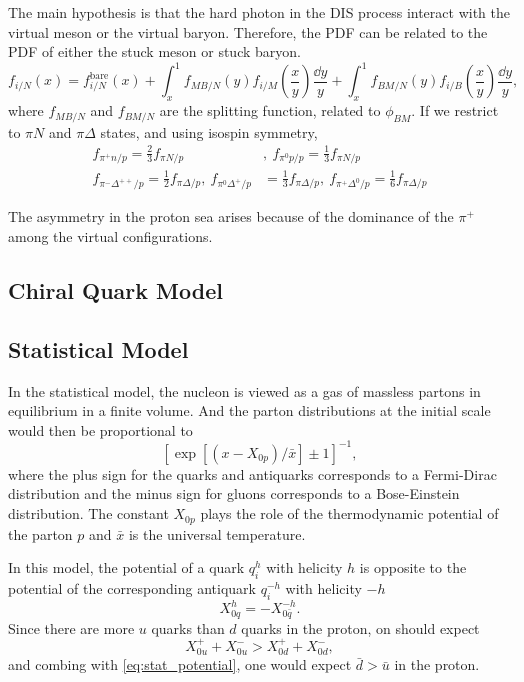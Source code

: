 \documentclass[../main.tex]{subfiles}
\begin{document}
The main hypothesis is that the hard photon in the DIS process interact with the virtual meson or the virtual
baryon. Therefore, the PDF can be related to the PDF of either the stuck meson or stuck baryon.
\begin{equation}
f_{i/N}\left(x\right) = f_{i/N}^{\mathrm{bare}}\left(x\right) +  \int^1_x f_{MB/N}\left(y\right) f_{i/M}\left(\frac{x}{y}\right) \frac{\dd{y}}{y} + \int^1_x f_{BM/N}\left(y\right) f_{i/B}\left(\frac{x}{y}\right) \frac{\dd{y}}{y},
\end{equation}
where $f_{MB/N}$ and $f_{BM/N}$ are the splitting function, related to $\phi_{BM}$.
If we restrict to $\pi N$ and $\pi\Delta$ states, and using isospin symmetry, 
\begin{align}
	f_{\pi^+n/p}=\frac{2}{3} f_{\pi N/p}&, ~f_{\pi^0 p/p}=\frac{1}{3} f_{\pi N/p}\\
	f_{\pi^-\Delta^{++}/p}=\frac{1}{2} f_{\pi \Delta/p}, ~f_{\pi^0 \Delta^+/p}&=\frac{1}{3} f_{\pi \Delta/p},  ~f_{\pi^+ \Delta^0/p}=\frac{1}{6} f_{\pi \Delta/p}
\end{align}

The asymmetry in the proton sea arises because of the dominance of the $\pi^+$ among the virtual
configurations.

\subsection{Chiral Quark Model}

\subsection{Statistical Model}
In the statistical model, the nucleon is viewed as a gas of massless partons in equilibrium in
a finite volume. And the parton distributions at the initial scale would then be proportional to
\begin{equation}
	\left[ \exp\left[\left(x-X_{0p}\right)/\bar{x}\right] \pm 1 \right]^{-1},
\end{equation}
where the plus sign for the quarks and antiquarks corresponds to a Fermi-Dirac distribution and
the minus sign for gluons corresponds to a Bose-Einstein distribution. The constant $X_{0p}$
plays the role of the thermodynamic potential of the parton $p$ and $\bar{x}$ is the universal
temperature.

In this model, the potential of a quark $q_i^h$ with helicity $h$ is opposite to the potential
of the corresponding antiquark $q_i^{-h}$ with helicity $-h$
\begin{equation}
	X_{0q}^h = -X_{0\bar{q}}^{-h}.
	\label{eq:stat_potential}
\end{equation}
Since there are more $u$ quarks than $d$ quarks in the proton, on should expect 
\begin{equation}
	X_{0u}^+ + X_{0u}^- > X_{0d}^+ + X_{0d}^-,
\end{equation}
and combing with \cref{eq:stat_potential}, one would expect $\bar{d} > \bar{u}$ in the proton.
\end{document}
